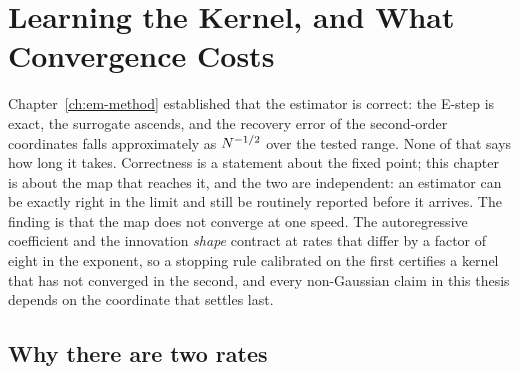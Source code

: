 
\chapter{Learning the Kernel, and What Convergence Costs}\label{ch:em-kernel}

Chapter~\ref{ch:em-method} established that the estimator is correct: the
E-step is exact, the surrogate ascends, and the recovery error of the
second-order coordinates falls approximately as $N^{-1/2}$ over the
tested range. None of that says how long it takes. Correctness is a statement
about the fixed point; this chapter is about the map that reaches it, and the
two are independent: an estimator can be exactly right in the limit and still
be routinely reported before it arrives. The finding is that the map does not
converge at one speed. The autoregressive coefficient and the innovation
\emph{shape} contract at rates that differ by a factor of eight in the
exponent, so a stopping rule calibrated on the first certifies a kernel that
has not converged in the second, and every non-Gaussian claim in this thesis
depends on the coordinate that settles last.

\section{Why there are two rates}\label{sec:em-rate-theory}\label{sec:em-two-effects}\label{sec:em-which-slower}

